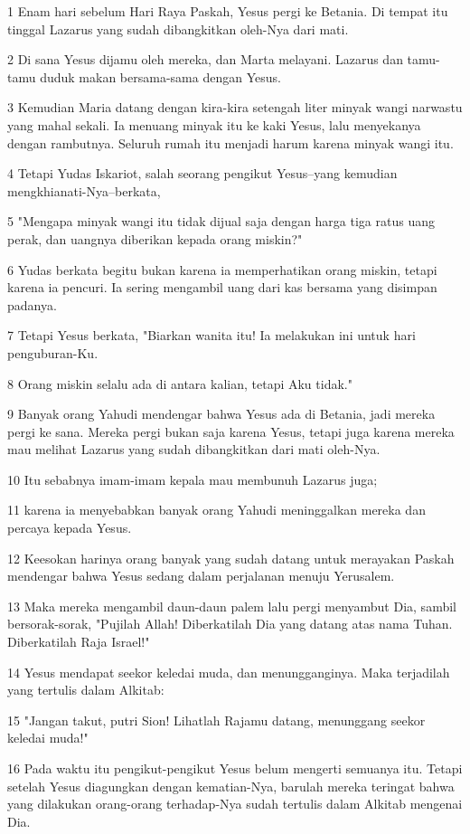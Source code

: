 \par 1 Enam hari sebelum Hari Raya Paskah, Yesus pergi ke Betania. Di tempat itu tinggal Lazarus yang sudah dibangkitkan oleh-Nya dari mati.
\par 2 Di sana Yesus dijamu oleh mereka, dan Marta melayani. Lazarus dan tamu-tamu duduk makan bersama-sama dengan Yesus.
\par 3 Kemudian Maria datang dengan kira-kira setengah liter minyak wangi narwastu yang mahal sekali. Ia menuang minyak itu ke kaki Yesus, lalu menyekanya dengan rambutnya. Seluruh rumah itu menjadi harum karena minyak wangi itu.
\par 4 Tetapi Yudas Iskariot, salah seorang pengikut Yesus--yang kemudian mengkhianati-Nya--berkata,
\par 5 "Mengapa minyak wangi itu tidak dijual saja dengan harga tiga ratus uang perak, dan uangnya diberikan kepada orang miskin?"
\par 6 Yudas berkata begitu bukan karena ia memperhatikan orang miskin, tetapi karena ia pencuri. Ia sering mengambil uang dari kas bersama yang disimpan padanya.
\par 7 Tetapi Yesus berkata, "Biarkan wanita itu! Ia melakukan ini untuk hari penguburan-Ku.
\par 8 Orang miskin selalu ada di antara kalian, tetapi Aku tidak."
\par 9 Banyak orang Yahudi mendengar bahwa Yesus ada di Betania, jadi mereka pergi ke sana. Mereka pergi bukan saja karena Yesus, tetapi juga karena mereka mau melihat Lazarus yang sudah dibangkitkan dari mati oleh-Nya.
\par 10 Itu sebabnya imam-imam kepala mau membunuh Lazarus juga;
\par 11 karena ia menyebabkan banyak orang Yahudi meninggalkan mereka dan percaya kepada Yesus.
\par 12 Keesokan harinya orang banyak yang sudah datang untuk merayakan Paskah mendengar bahwa Yesus sedang dalam perjalanan menuju Yerusalem.
\par 13 Maka mereka mengambil daun-daun palem lalu pergi menyambut Dia, sambil bersorak-sorak, "Pujilah Allah! Diberkatilah Dia yang datang atas nama Tuhan. Diberkatilah Raja Israel!"
\par 14 Yesus mendapat seekor keledai muda, dan menungganginya. Maka terjadilah yang tertulis dalam Alkitab:
\par 15 "Jangan takut, putri Sion! Lihatlah Rajamu datang, menunggang seekor keledai muda!"
\par 16 Pada waktu itu pengikut-pengikut Yesus belum mengerti semuanya itu. Tetapi setelah Yesus diagungkan dengan kematian-Nya, barulah mereka teringat bahwa yang dilakukan orang-orang terhadap-Nya sudah tertulis dalam Alkitab mengenai Dia.

